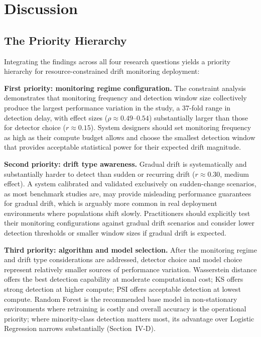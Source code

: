 \documentclass[conference]{IEEEtran}
\begin{document}
\section{Discussion}

\subsection{The Priority Hierarchy}

Integrating the findings across all four research questions yields a priority hierarchy for resource-constrained drift monitoring deployment:

\textbf{First priority: monitoring regime configuration.} The constraint analysis demonstrates that monitoring frequency and detection window size collectively produce the largest performance variation in the study, a 37-fold range in detection delay, with effect sizes ($\rho \approx 0.49$--$0.54$) substantially larger than those for detector choice ($r \approx 0.15$). System designers should set monitoring frequency as high as their compute budget allows and choose the smallest detection window that provides acceptable statistical power for their expected drift magnitude.

\textbf{Second priority: drift type awareness.} Gradual drift is systematically and substantially harder to detect than sudden or recurring drift ($r \approx 0.30$, medium effect). A system calibrated and validated exclusively on sudden-change scenarios, as most benchmark studies are, may provide misleading performance guarantees for gradual drift, which is arguably more common in real deployment environments where populations shift slowly. Practitioners should explicitly test their monitoring configurations against gradual drift scenarios and consider lower detection thresholds or smaller window sizes if gradual drift is expected.

\textbf{Third priority: algorithm and model selection.} After the monitoring regime and drift type considerations are addressed, detector choice and model choice represent relatively smaller sources of performance variation. Wasserstein distance offers the best detection capability at moderate computational cost; KS offers strong detection at higher compute; PSI offers acceptable detection at lowest compute. Random Forest is the recommended base model in non-stationary environments where retraining is costly and overall accuracy is the operational priority; where minority-class detection matters most, its advantage over Logistic Regression narrows substantially (Section~IV-D).
\end{document}
